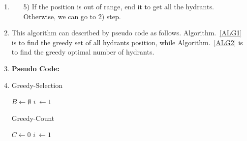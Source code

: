 \documentclass[12pt,a4paper]{article}
\makeatletter
\newtheorem*{solution}{Solution}
\theoremstyle{definition}
\renewenvironment{solution}[1][Solution] {\par\pushQED{\qed}\normalfont\topsep6\p@\@plus6\p@\relax\trivlist\item[\hskip\labelsep\bfseries#1\@addpunct{.}]\ignorespaces}{\popQED\endtrivlist\@endpefalse} \makeatother
\makeatother
\begin{document}
\begin{enumerate}
\begin{solution}
\begin{itemize}
    \item [5)] If the position is out of range, end it to get all the hydrants. Otherwise, we can go to 2) step.
    \end{itemize}\item
    This algorithm can described by pseudo code as follows. Algorithm.~\ref{ALG1} is to find the greedy set of all hydrants position, while Algorithm.~\ref{ALG2} is to find the greedy optimal number of hydrants.
    \item
    \textbf{Pseudo Code:}
    \item
        \begin{minipage}[t]{0.9\textwidth}
        \begin{algorithm}[H]
        \BlankLine
        \caption{Greedy-Selection}
        \label{ALG1}
        \BlankLine
	    $B\leftarrow \emptyset$\;
	    $i\ \leftarrow 1$\;

        \end{algorithm}
        \end{minipage}
        \hfill

        \begin{minipage}[t]{0.9\textwidth}
        \begin{algorithm}[H]
        \BlankLine
        \caption{Greedy-Count}
        \label{ALG2}
        \BlankLine
	    $C\leftarrow 0$\;
	    $i\ \leftarrow 1$\;


\end{algorithm}
\end{minipage}
\end{solution}
\end{enumerate}
\end{document}

